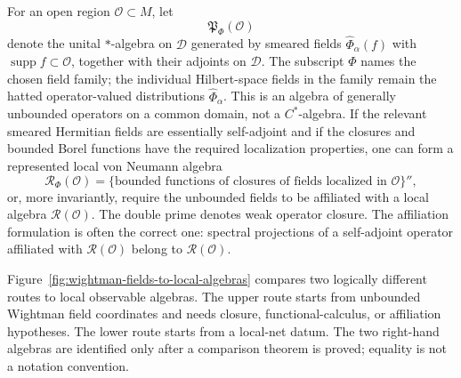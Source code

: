 For an open region \(\mathcal O\subset M\), let
\[
  \mathfrak P_\Phi(\mathcal O)
\]
denote the unital \(*\)-algebra on \(\mathcal D\) generated by smeared fields
\(\widehat\Phi_\alpha(f)\) with \(\operatorname{supp}f\subset\mathcal O\), together
with their adjoints on \(\mathcal D\).  The subscript \(\Phi\) names the chosen
field family; the individual Hilbert-space fields in the family remain the
hatted operator-valued distributions \(\widehat\Phi_\alpha\).  This is an
algebra of generally unbounded operators on a common domain, not a
\(C^*\)-algebra.  If the
relevant smeared Hermitian fields are essentially self-adjoint and if the
closures and bounded Borel functions have the required localization
properties, one can form a represented local von Neumann algebra
\begin{equation}
  \mathcal R_\Phi(\mathcal O)
  =
  \{\text{bounded functions of closures of fields localized in }\mathcal O\}'',
  \label{eq:wightman-generated-local-vn-algebra}
\end{equation}
or, more invariantly, require the unbounded fields to be affiliated with a
local algebra \(\mathcal R(\mathcal O)\).  The double prime denotes weak
operator closure.  The affiliation formulation is often the correct one:
spectral projections of a self-adjoint operator affiliated with
\(\mathcal R(\mathcal O)\) belong to \(\mathcal R(\mathcal O)\).

Figure~\ref{fig:wightman-fields-to-local-algebras} compares two logically
different routes to local observable algebras.  The upper route starts from
unbounded Wightman field coordinates and needs closure, functional-calculus,
or affiliation hypotheses.  The lower route starts from a local-net datum.
The two right-hand algebras are identified only after a comparison theorem is
proved; equality is not a notation convention.


